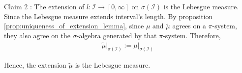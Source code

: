 \begin{proof*}
\begin{subproof}{\newline Claim 2 : The extension of $l:\mathcal{I}\to[0,\infty]$ on $\sigma(\mathcal{I})$ is the Lebesgue measure.}
        \noindent Since the Lebesgue measure extends interval's length. By proposition \ref{prop:uniqueness_of_extension_lemma}, since $\mu$ and $\tilde\mu$ agrees on a $\pi$-system, they also agree on the $\sigma$-algebra generated by that $\pi$-system. Therefore,
        \begin{align*}
            \tilde\mu\Big|_{\sigma(\mathcal{I})} := \mu\Big|_{\sigma(\mathcal{I})} 
        \end{align*}

        \noindent Hence, the extension $\tilde\mu$ is the Lebesgue measure.
    \end{subproof}
\end{proof*}
